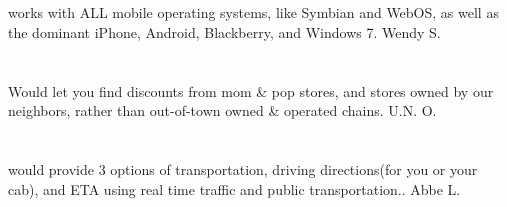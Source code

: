 \section{}works with ALL mobile operating systems,  like Symbian and WebOS,  as well as the dominant iPhone,  Android,  Blackberry,  and Windows 7. Wendy S.
\section{}Would let you find discounts from mom \& pop stores,  and stores owned by our neighbors,  rather than out-of-town owned \& operated chains. U.N. O.
\section{}would provide 3 options of transportation, driving directions(for you or your cab), and ETA using real time traffic and public transportation.. Abbe L.